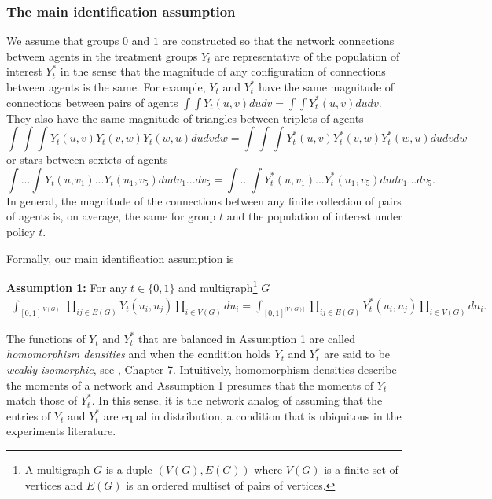 \documentclass[12pt]{article}
\theoremstyle{definition}
\begin{document}
\subsubsection{The main identification assumption}
We assume that groups $0$ and $1$ are constructed so that the network connections between agents in the treatment groups $Y_{t}$ are representative of the population of interest $Y_{t}^{*}$ in the sense that the magnitude of any configuration of connections between agents is the same. For example, $Y_{t}$ and $Y_{t}^{*}$ have the same magnitude of connections between pairs of agents $\int\int Y_{t}(u,v)dudv = \int\int Y_{t}^{*}(u,v)dudv$. They also have the same magnitude of triangles between triplets of agents $$\int\int\int Y_{t}(u,v)Y_{t}(v,w)Y_{t}(w,u) dudvdw = \int\int\int Y_{t}^{*}(u,v)Y_{t}^{*}(v,w)Y_{t}^{*}(w,u) dudvdw$$ or stars between sextets of agents $$\int...\int Y_{t}(u,v_{1})...Y_{t}(u_{1},v_{5}) dudv_{1}...dv_{5} = \int...\int Y_{t}^{*}(u,v_{1})...Y_{t}^{*}(u_{1},v_{5}) dudv_{1}...dv_{5}.$$ In general, the magnitude of the connections between any finite collection of pairs of agents is, on average, the same for group $t$ and the population of interest under policy $t$. 


Formally, our main identification assumption is  
\begin{flushleft}\label{a1}
\textbf{Assumption 1:}  For any $t \in \{0,1\}$ and multigraph\footnote{A multigraph $G$ is a duple $(V(G),E(G))$ where $V(G)$ is a finite set of vertices and $E(G)$ is an ordered multiset of pairs of vertices.} $G$
\begin{align}
\int_{[0,1]^{|V(G)|}}\prod_{ij \in E(G)}Y_{t}(u_{i},u_{j})\prod_{i \in V(G)}du_{i} = \int_{[0,1]^{|V(G)|}}\prod_{ij \in E(G)}Y_{t}^{*}(u_{i},u_{j})\prod_{i \in V(G)}du_{i}.
\end{align}
\end{flushleft}
The functions of $Y_{t}$ and $Y_{t}^{*}$ that are balanced in Assumption 1 are called \emph{homomorphism densities} and when the condition holds  $Y_{t}$ and $Y_{t}^{*}$ are said to be \emph{weakly isomorphic}, see \cite{lovasz2012large}, Chapter 7. Intuitively, homomorphism densities describe the moments of a network and Assumption 1  presumes that the moments of $Y_{t}$ match those of  $Y_{t}^{*}$. In this sense, it is the network analog of assuming that the entries of $Y_{t}$ and $Y_{t}^{*}$ are equal in distribution, a condition that is ubiquitous in the experiments literature.  
\end{document}
